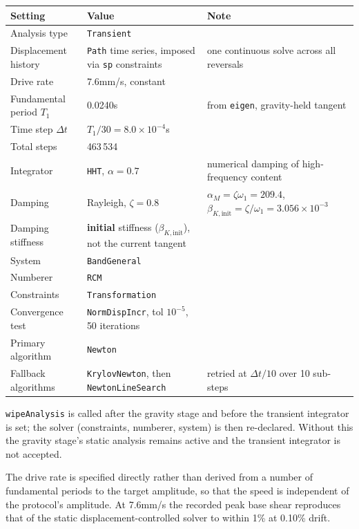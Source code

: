 \documentclass[11pt,a4paper]{article}
\begin{document}
\begin{tabularx}{\textwidth}{@{}p{50mm}p{38mm}>{\raggedright\arraybackslash}X@{}}
\toprule
\textbf{Setting} & \textbf{Value} & \textbf{Note} \\
\midrule
Analysis type         & \texttt{Transient} & \\
Displacement history  & \texttt{Path} time series, imposed via \texttt{sp} constraints & one continuous solve across all reversals \\
Drive rate            & 7.6\unit{mm/s}, constant & \\
Fundamental period $T_1$ & 0.0240\unit{s} & from \texttt{eigen}, gravity-held tangent \\
Time step $\Delta t$  & $T_1/30 = 8.0\times10^{-4}$\unit{s} & \\
Total steps           & 463\,534 & \\
Integrator            & \texttt{HHT}, $\alpha = 0.7$ & numerical damping of high-frequency content \\
Damping               & Rayleigh, $\zeta = 0.8$ & $\alpha_M = \zeta\omega_1 = 209.4$, $\beta_{K,\text{init}} = \zeta/\omega_1 = 3.056\times10^{-3}$ \\
Damping stiffness     & \textbf{initial} stiffness ($\beta_{K,\text{init}}$), not the current tangent & \\
System                & \texttt{BandGeneral} & \\
Numberer              & \texttt{RCM} & \\
Constraints           & \texttt{Transformation} & \\
Convergence test      & \texttt{NormDispIncr}, tol $10^{-5}$, 50 iterations & \\
Primary algorithm     & \texttt{Newton} & \\
Fallback algorithms   & \texttt{KrylovNewton}, then \texttt{NewtonLineSearch} & retried at $\Delta t/10$ over 10 sub-steps \\
\bottomrule
\end{tabularx}

\texttt{wipeAnalysis} is called after the gravity stage and before the transient integrator is set;
the solver (constraints, numberer, system) is then re-declared. Without this the gravity stage's
static analysis remains active and the transient integrator is not accepted.

The drive rate is specified directly rather than derived from a number of fundamental periods to
the target amplitude, so that the speed is independent of the protocol's amplitude. At
7.6\unit{mm/s} the recorded peak base shear reproduces that of the static displacement-controlled
solver to within 1\% at 0.10\% drift.
\end{document}
